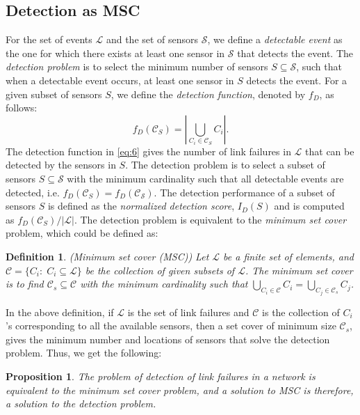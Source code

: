 \documentclass[twocolumn]{autart}
\newtheorem{proposition}[theorem]{\bf Proposition}
\newtheorem{definition}{\bf Definition}[section]
\begin{document}
\subsection{Detection as MSC} \label{sec:dmsc}\vspace{-0.35cm}
For the set of events $\mathcal{L}$ and the set of sensors $\mathcal{S}$, we define a \textit{detectable event} as the one for which there exists at least one sensor in $\mathcal{S}$ that detects the event. The \textit{detection problem} is to select the minimum number of sensors $S\subseteq\mathcal{S}$, such that when a detectable event occurs, at least one sensor in $S$ detects the event. For a given subset of sensors $S$, we define the \textit{detection function}, denoted by $f_D$, as follows:
\vspace{-0.35cm}
\begin{equation}\label{eq:6}
f_D(\mathcal{C}_S) = \left\lvert \bigcup\limits_{C_i\in\mathcal{C}_S}C_i\right\rvert.
\end{equation} 
The detection function in \eqref{eq:6} gives the number of link failures in $\mathcal{L}$ that can be detected by the sensors in $S$. The detection problem is to select a subset of sensors $S\subseteq\mathcal{S}$ with the minimum cardinality such that all detectable events are detected, i.e. $f_D(\mathcal{C}_S) = f_D(\mathcal{C}_\mathcal{S})$. The detection performance of a subset of sensors $S$ is defined as the \textit{normalized detection score}, $I_D(S)$ and is computed as $f_D(\mathcal{C}_S)/|\mathcal{L}|$. 
The detection problem is equivalent to the \textit{minimum set cover} problem, which could be defined as: \vspace{-0.15cm}

\begin{definition} (Minimum set cover (MSC))
\label{def:set_cover}
Let $\mathcal{L}$ be a finite set of elements, and $\mathcal{C}=\{C_i:\;C_i\subseteq\mathcal{L}\}$ be the collection of given subsets of $\mathcal{L}$. The minimum set cover is to find $\mathcal{C}_s\subseteq\mathcal{C}$ with the minimum cardinality such that $\bigcup\limits_{C_i\in\mathcal{C}}C_i= \bigcup\limits_{C_j\in\mathcal{C}_s}C_j$.
\end{definition} \vspace{-0.15cm}


In the above definition, if $\mathcal{L}$ is the set of link failures and $\mathcal{C}$ is the collection of $C_i$'s corresponding to all the available sensors, then a set cover of minimum size $\mathcal{C}_s$, gives the minimum number and locations of sensors that solve the detection problem. 
Thus, we get the following:
\begin{proposition}
The problem of detection of link failures in a network is equivalent to the minimum set cover problem, and a solution to MSC is therefore, a solution to the detection problem.
\end{proposition}
\end{document}
